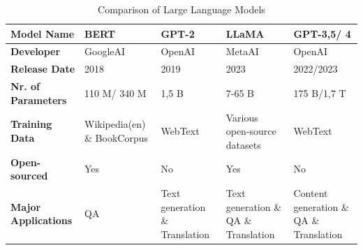 \documentclass[runningheads]{llncs}
\begin{document}
\begin{table}[H]
  \centering
  \begin{tabular}{| p{4cm} | p{2cm} | p{2cm} | p{2cm} | p{2cm} |}
  \hline
  \textbf{Model Name} & BERT & GPT-2 & LLaMA & GPT-3,5/ 4 \\
  \hline
  \textbf{Developer} & GoogleAI & OpenAI & MetaAI & OpenAI \\
  \hline
  \textbf{Release Date} & 2018 & 2019 & 2023 & 2022/2023 \\
  \hline
  \textbf{Nr. of Parameters} & 110 M/ 340 M & 1,5 B & 7-65 B & 175 B/1,7 T \\
  \hline
  \textbf{Training Data} & Wikipedia(en) \& BookCorpus & WebText & Various open-source datasets & WebText \\
  \hline
  \textbf{Open-sourced} & Yes & No & Yes & No \\
  \hline
  \textbf{Major Applications} & QA & Text generation \& Translation & Text generation \& QA \& Translation & Content generation \& QA \& Translation \\
  \hline
  \end{tabular}
  \caption{Comparison of Large Language Models}
  \label{table:comparison}
  \end{table}
\end{document}
